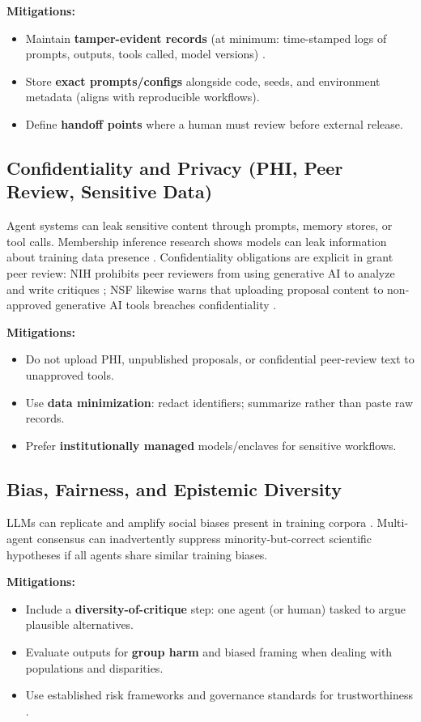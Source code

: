 \documentclass[11pt]{article}
\begin{document}
\textbf{Mitigations:}
\begin{itemize}
\item Maintain \textbf{tamper-evident records} (at minimum: time-stamped logs of prompts, outputs, tools called, model versions) \citep{gutierrez2025}.
\item Store \textbf{exact prompts/configs} alongside code, seeds, and environment metadata (aligns with reproducible workflows).
\item Define \textbf{handoff points} where a human must review before external release.
\end{itemize}

\subsection{Confidentiality and Privacy (PHI, Peer Review, Sensitive Data)}
Agent systems can leak sensitive content through prompts, memory stores, or tool calls. Membership inference research shows models can leak information about training data presence \citep{shokri2017}. Confidentiality obligations are explicit in grant peer review: NIH prohibits peer reviewers from using generative AI to analyze and write critiques \citep{nih_ai_peerreview}; NSF likewise warns that uploading proposal content to non-approved generative AI tools breaches confidentiality \citep{nsf_ai_notice}.

\textbf{Mitigations:}
\begin{itemize}
\item Do not upload PHI, unpublished proposals, or confidential peer-review text to unapproved tools.
\item Use \textbf{data minimization}: redact identifiers; summarize rather than paste raw records.
\item Prefer \textbf{institutionally managed} models/enclaves for sensitive workflows.
\end{itemize}

\subsection{Bias, Fairness, and Epistemic Diversity}
LLMs can replicate and amplify social biases present in training corpora \citep{bender2021, weidinger2021}. Multi-agent consensus can inadvertently suppress minority-but-correct scientific hypotheses if all agents share similar training biases.

\textbf{Mitigations:}
\begin{itemize}
\item Include a \textbf{diversity-of-critique} step: one agent (or human) tasked to argue plausible alternatives.
\item Evaluate outputs for \textbf{group harm} and biased framing when dealing with populations and disparities.
\item Use established risk frameworks and governance standards for trustworthiness \citep{nist_rmf, unesco_ai, oecd_ai}.
\end{itemize}
\end{document}
